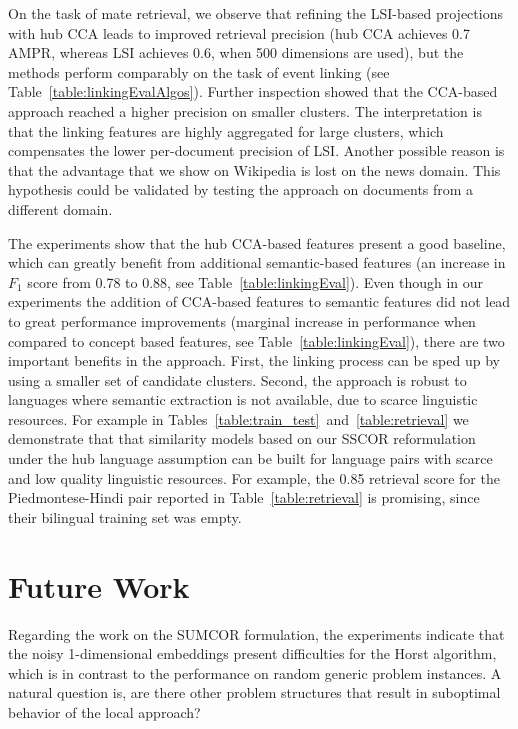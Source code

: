 On the task of mate retrieval, we observe that refining the LSI-based
projections with hub CCA leads to improved retrieval precision (hub CCA
achieves 0.7 AMPR, whereas LSI achieves 0.6, when 500 dimensions are used), but the
methods perform comparably on the task of event linking (see Table~\ref{table:linkingEvalAlgos}). 
Further inspection showed that the CCA-based approach reached a higher precision on smaller
clusters. The interpretation is that the linking features are highly
aggregated for large clusters, which compensates the lower per-document
precision of LSI. Another possible reason is that the advantage that we
show on Wikipedia is lost on the news domain. This hypothesis could be
validated by testing the approach on documents from a different domain.

The experiments show that the hub CCA-based features present a good baseline,
which can greatly benefit from additional semantic-based features (an increase
in $F_1$ score from 0.78 to 0.88, see Table~\ref{table:linkingEval}).
Even though in our experiments the addition of CCA-based features to semantic features did not
lead to great performance improvements (marginal increase in performance when compared
to concept based features, see Table~\ref{table:linkingEval}), there are two important benefits in the
approach. First, the linking process can be sped up by using a smaller set of
candidate clusters. Second, the approach is robust to languages where semantic
extraction is not available, due to scarce linguistic resources.
For example in Tables~\ref{table:train_test}~and~\ref{table:retrieval} we demonstrate
that that similarity models based on our SSCOR reformulation under the hub language
assumption can be built for language pairs with scarce and
low quality linguistic resources. For example, the 0.85 retrieval score
for the Piedmontese-Hindi pair reported in Table~\ref{table:retrieval} is
promising, since their bilingual training set was empty.

\section{Future Work}

Regarding the work on the SUMCOR formulation, the experiments indicate
that the noisy 1-dimensional embeddings present difficulties for the Horst
algorithm, which is in contrast to the performance on random generic problem instances. A natural
question is, are there other problem structures that result in suboptimal behavior of the local approach?

